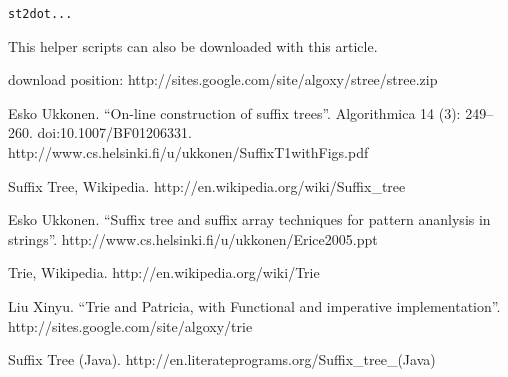 \documentclass{article}
\begin{document}
\begin{verbatim}
st2dot...
\end{verbatim}

This helper scripts can also be downloaded with this article.

download position: http://sites.google.com/site/algoxy/stree/stree.zip

\begin{thebibliography}{99}

Esko Ukkonen. ``On-line construction of suffix trees''. Algorithmica 14 (3): 249--260. doi:10.1007/BF01206331. http://www.cs.helsinki.fi/u/ukkonen/SuffixT1withFigs.pdf

Suffix Tree, Wikipedia. http://en.wikipedia.org/wiki/Suffix\_tree

Esko Ukkonen. ``Suffix tree and suffix array techniques for pattern ananlysis in strings''. http://www.cs.helsinki.fi/u/ukkonen/Erice2005.ppt

Trie, Wikipedia. http://en.wikipedia.org/wiki/Trie

Liu Xinyu. ``Trie and Patricia, with Functional and imperative implementation''. http://sites.google.com/site/algoxy/trie

Suffix Tree (Java). http://en.literateprograms.org/Suffix\_tree\_(Java)

\end{thebibliography}

\ifx\wholebook\relax \else
\end{document}
